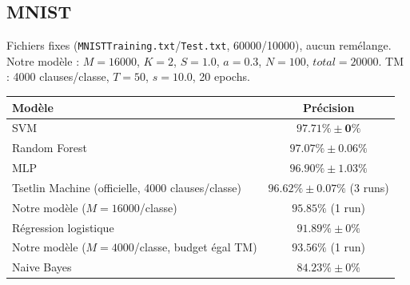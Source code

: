\documentclass[12pt,a4paper]{article}
\begin{document}
\subsection*{MNIST}
Fichiers fixes (\texttt{MNISTTraining.txt}/\texttt{Test.txt}, 60000/10000),
aucun remélange. Notre modèle : $M{=}16000$, $K{=}2$, $S{=}1.0$, $a{=}0.3$,
$N{=}100$, $total{=}20000$. TM : 4000 clauses/classe, $T{=}50$, $s{=}10.0$,
20 epochs.
\begin{center}
\begin{tabular}{lc}
\toprule
Modèle & Précision \\
\midrule
SVM & $\mathbf{97.71\%\pm0\%}$ \\
Random Forest & $97.07\%\pm0.06\%$ \\
MLP & $96.90\%\pm1.03\%$ \\
Tsetlin Machine (officielle, 4000 clauses/classe) & $96.62\%\pm0.07\%$ (3 runs) \\
Notre modèle ($M{=}16000$/classe) & $95.85\%$ (1 run) \\
Régression logistique & $91.89\%\pm0\%$ \\
Notre modèle ($M{=}4000$/classe, budget égal TM) & $93.56\%$ (1 run) \\
Naive Bayes & $84.23\%\pm0\%$ \\
\bottomrule
\end{tabular}
\end{center}
\end{document}
